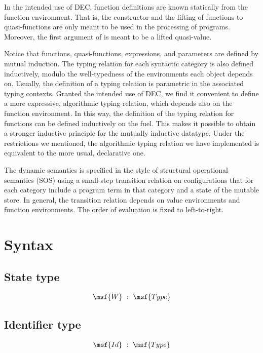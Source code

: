 \documentclass{article}
\begin{document}
In the intended use of DEC, function definitions are known statically
from the function environment. That is, the  constructor
and the  lifting of functions to quasi-functions are only
meant to be used in the processing of programs. Moreover, the first
argument of  is meant to be a lifted quasi-value.

Notice that functions, quasi-functions, expressions, and parameters
are defined by mutual induction. The typing relation for each
syntactic category is also defined inductively, modulo the
well-typedness of the environments each object depends on. Usually,
the definition of a typing relation is parametric in the associated
typing contexts. Granted the intended use of DEC, we find it
convenient to define a more expressive, algorithmic typing relation,
which depends also on the function environment. In this way, the
definition of the typing relation for functions can be defined
inductively on the fuel.  This makes it possible to obtain a stronger
inductive principle for the mutually inductive datatype. Under the
restrictions we mentioned, the algorithmic typing relation we have
implemented is equivalent to the more usual, declarative one.

The dynamic semantics is specified in the style of structural
operational semantics (SOS) using a small-step transition relation on
configurations that for each category include a program term in that
category and a state of the mutable store. In general, the transition
relation depends on value environments and function environments. The
order of evaluation is fixed to left-to-right.



\section{Syntax}


\subsection{State type}

\begin{gather}
  \msf{W} \ : \ \msf{Type}
\end{gather}


\subsection{Identifier type}

\begin{gather}
  \msf{Id} \ : \ \msf{Type}
\end{gather}
\end{document}
